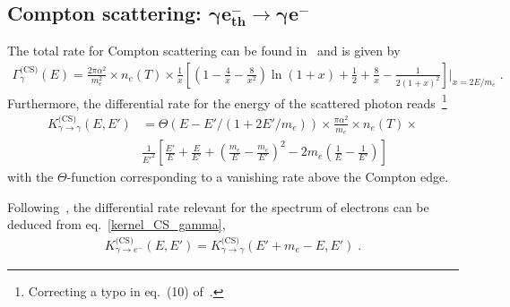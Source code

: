 \documentclass[11pt,a4paper]{article}
\newcommand{\eq}[1]{#1}
\newcommand{\eqsp}{\;}
\begin{document}
\subsection*{Compton scattering: $\boldsymbol{\gamma e^-_\text{th} \rightarrow \gamma e^-}$}
The total rate for Compton scattering can be found in~\cite{Kawasaki:1994sc, Poulin:2015opa} and is given by
\begin{align}
\Gamma_\gamma^\text{(CS)}(E) = \frac{2\pi\alpha^2}{m_e^2}\times\eq{n}_e(T)\times\frac{1}{x}\left[ \left(1 - \frac{4}{x} - \frac{8}{x^2}\right)\ln(1+x) + \frac12 + \frac8x - \frac{1}{2(1+x)^2}\right]\Bigg|_{x=2E/m_e} \eqsp.
\end{align}
Furthermore, the differential rate for the energy of the scattered photon reads~\cite{Kawasaki:1994sc, Poulin:2015opa}\footnote{Correcting a typo in eq.~(10) of~\cite{Poulin:2015opa}.}
\begin{align}
K_{\gamma \rightarrow \gamma}^\text{(CS)}(E, E') &= \Theta(E-E'/(1+2E'/m_e)) \times  \frac{\pi\alpha^2}{m_e}\times \eq{n}_e(T)\times \nonumber \\
&\frac{1}{E'^2}\left[ \frac{E'}{E} + \frac{E}{E'} + \left( \frac{m_e}{E} - \frac{m_e}{E'} \right)^2 - 2m_e\left( \frac{1}{E} - \frac{1}{E'} \right) \right]
\label{kernel_CS_gamma}
\end{align}
with the $\Theta$-function corresponding to a vanishing rate above the Compton edge.

Following~\cite{Kawasaki:1994sc}, the differential rate relevant for the spectrum of electrons can be deduced from eq.~\eqref{kernel_CS_gamma},
\begin{align}
K_{\gamma \rightarrow e^-}^\text{(CS)}(E, E') = K_{\gamma \rightarrow \gamma}^\text{(CS)}(E' + m_e - E, E')\eqsp.
\end{align}
\end{document}
